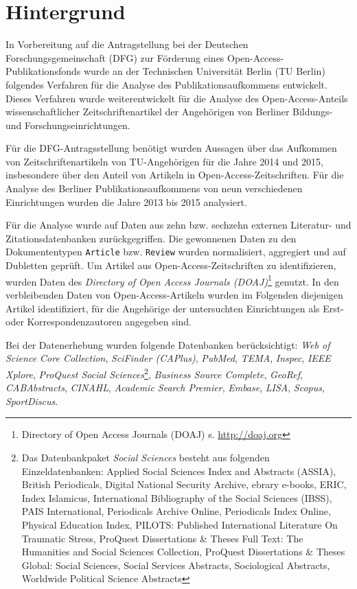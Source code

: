 \section{Hintergrund}
\label{hintergrund}
In Vorbereitung auf die Antragstellung bei der Deutschen Forschungsgemeinschaft (DFG) zur Förderung eines Open-Access-Publikationsfonds wurde an der Technischen Universität Berlin (TU Berlin) folgendes Verfahren für die Analyse des Publikationsaufkommens entwickelt. Dieses Verfahren wurde weiterentwickelt für die Analyse des Open-Access-Anteils wissenschaftlicher Zeitschriftenartikel der Angehörigen von Berliner Bildungs- und Forschungseinrichtungen.

Für die DFG-Antragsstellung benötigt wurden Aussagen über das Aufkommen von Zeitschriftenartikeln von TU-Angehörigen für die  Jahre 2014 und 2015, insbesondere über den Anteil von Artikeln in Open-Access-Zeitschriften. Für die Analyse des Berliner Publikationsaufkommens von neun verschiedenen Einrichtungen wurden die Jahre 2013 bis 2015 analysiert. 

Für die Analyse wurde auf Daten aus zehn bzw. sechzehn externen Literatur- und Zitationsdatenbanken zurückgegriffen.
Die gewonnenen Daten zu den Dokumententypen \texttt{Article} bzw. \texttt{Review} wurden normalisiert, aggregiert und auf Dubletten geprüft. Um Artikel aus Open-Access-Zeitschriften zu identifizieren, wurden Daten des \textit{Directory of Open Access Journals (DOAJ)}\footnote{Directory of Open Access Journals (DOAJ) s. \url{http://doaj.org}} genutzt. In den verbleibenden Daten von Open-Access-Artikeln wurden im Folgenden diejenigen Artikel identifiziert, für die Angehörige der untersuchten Einrichtungen als Erst- oder Korrespondenzautoren angegeben sind.

Bei der Datenerhebung wurden folgende Datenbanken berücksichtigt: \textit{Web of Science Core Collection}, \textit{SciFinder (CAPlus)}, \textit{PubMed}, \textit{TEMA}, \textit{Inspec}, \textit{IEEE Xplore}, \textit{ProQuest Social Sciences}\footnote{Das Datenbankpaket \textit{Social Sciences} besteht aus folgenden Einzeldatenbanken: Applied Social Sciences Index and Abstracts (ASSIA), British Periodicals, Digital National Security Archive, ebrary e-books, ERIC, Index Islamicus, International Bibliography of the Social Sciences (IBSS), PAIS International, Periodicals Archive Online, Periodicals Index Online, Physical Education Index, PILOTS: Published International Literature On Traumatic Stress, ProQuest Dissertations \& Theses Full Text: The Humanities and Social Sciences Collection, ProQuest Dissertations \& Theses Global: Social Sciences, Social Services Abstracts, Sociological Abstracts, Worldwide Political Science Abstracts}, \textit{Business Source Complete}, \textit{GeoRef}, \textit{CABAbstracts}, \textit{CINAHL}, \textit{Academic Search Premier}, \textit{Embase}, \textit{LISA}, \textit{Scopus}, \textit{SportDiscus}.

